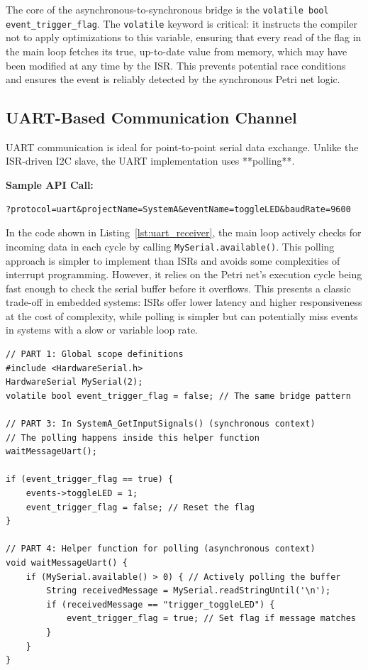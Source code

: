 The core of the asynchronous-to-synchronous bridge is the \texttt{volatile bool event\_trigger\_flag}. The \texttt{volatile} keyword is critical: it instructs the compiler not to apply optimizations to this variable, ensuring that every read of the flag in the main loop fetches its true, up-to-date value from memory, which may have been modified at any time by the ISR. This prevents potential race conditions and ensures the event is reliably detected by the synchronous Petri net logic.

\subsection{UART-Based Communication Channel}
UART communication is ideal for point-to-point serial data exchange. Unlike the ISR-driven I2C slave, the UART implementation uses **polling**.

\noindent\textbf{Sample API Call:}
\begin{verbatim}
?protocol=uart&projectName=SystemA&eventName=toggleLED&baudRate=9600
\end{verbatim}

In the code shown in Listing~\ref{lst:uart_receiver}, the main loop actively checks for incoming data in each cycle by calling \texttt{MySerial.available()}. This polling approach is simpler to implement than ISRs and avoids some complexities of interrupt programming. However, it relies on the Petri net's execution cycle being fast enough to check the serial buffer before it overflows. This presents a classic trade-off in embedded systems: ISRs offer lower latency and higher responsiveness at the cost of complexity, while polling is simpler but can potentially miss events in systems with a slow or variable loop rate.

\begin{verbatim}
// PART 1: Global scope definitions
#include <HardwareSerial.h>
HardwareSerial MySerial(2);
volatile bool event_trigger_flag = false; // The same bridge pattern

// PART 3: In SystemA_GetInputSignals() (synchronous context)
// The polling happens inside this helper function
waitMessageUart(); 

if (event_trigger_flag == true) {
    events->toggleLED = 1;
    event_trigger_flag = false; // Reset the flag
}

// PART 4: Helper function for polling (asynchronous context)
void waitMessageUart() {
    if (MySerial.available() > 0) { // Actively polling the buffer
        String receivedMessage = MySerial.readStringUntil('\n');
        if (receivedMessage == "trigger_toggleLED") {
            event_trigger_flag = true; // Set flag if message matches
        }
    }
}
\end{verbatim}

